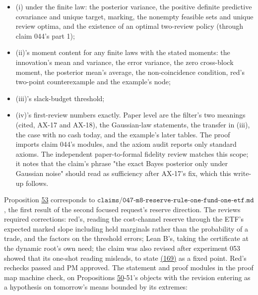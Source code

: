 \documentclass[11pt]{article}
\begin{document}
\begin{itemize}
  \item (i) under the finite law: the posterior variance, the positive
  definite predictive covariance and unique target, marking, the
  nonempty feasible sets and unique review optima, and the existence of
  an optimal two-review policy (through claim 044's part 1);
  \item (ii)'s moment content for any finite laws with the stated moments:
  the innovation's mean and variance, the error variance, the zero
  cross-block moment, the posterior mean's average, the non-coincidence
  condition, red's two-point counterexample and the example's node;
  \item (iii)'s slack-budget threshold;
  \item (iv)'s first-review numbers exactly.
Paper level are the filter's two meanings (cited, AX-17 and AX-18), the
Gaussian-law statements, the transfer in (iii), the case with no cash
today, and the example's later tables. The proof imports claim 044's
modules, and the axiom audit reports only standard axioms. The
independent paper-to-formal fidelity review matches this scope; it
notes that the claim's phrase "the exact Bayes posterior only under
Gaussian noise" should read as sufficiency after AX-17's fix, which
this write-up follows.
\end{itemize}

Proposition \hyperref[res:Proposition-53]{53} corresponds to
\(\texttt{claims/047-m8-reserve-rule-one-fund-one-etf.md}\), the first result of the
second focused request's reserve direction. The reviews required
corrections: red's, reading the cost-channel reserve through the ETF's
expected marked slope including held marginals rather than the
probability of a trade, and the factors on the threshold errors; Lean
B's, taking the certificate at the dynamic root's own need; the claim was
also revised after experiment 053 showed that its one-shot reading
misleads, to state \hyperref[eq:169]{(169)} as a fixed point. Red's rechecks passed and PM
approved. The statement and proof modules in the proof map machine
check, on Propositions \hyperref[res:Proposition-50]{50}-51's objects with the revision entering as
a hypothesis on tomorrow's means bounded by its extremes:
\end{document}
